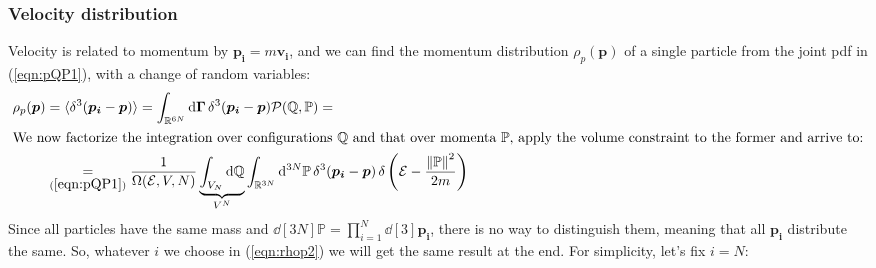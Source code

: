 \documentclass[../../main.tex]{subfiles}
\begin{document}
\subsubsection{Velocity distribution} 
Velocity is related to momentum by $\bm{p_i} = m \bm{v_i}$, and we can find the momentum distribution $\rho_p(\bm{p})$ of a single particle from the joint pdf in (\ref{eqn:pQP1}), with a change of random variables:
\begin{align}\nonumber
    \rho_p(\bm{p}) &= \langle \delta^3 (\bm{p_i} - \bm{p}) \rangle = \int_{\mathbb{R}^{6N}} \dd{\bm{\Gamma}} \delta^3 (\bm{p_i} - \bm{p}) \mathcal{P}(\mathbb{Q}, \mathbb{P}) =\\
    \shortintertext{We now factorize the integration over configurations $\mathbb{Q}$ and that over momenta $\mathbb{P}$, apply the volume constraint to the former and arrive to:}
    &\underset{(\ref{eqn:pQP1})}{=}  \frac{1}{\Omega(\mathcal{E}, V, N)} \underbrace{\int_{V_N} \dd{\mathbb{Q}}}_{V^N}  \int_{\mathbb{R}^{3N}} \dd[3N]{\mathbb{P}} \delta^3(\bm{p_i} - \bm{p})\, \delta\left(\mathcal{E}-\frac{\norm{\mathbb{P}}^2}{2m} \right) \label{eqn:rhop2}
\end{align}
Since all particles have the same mass and $\dd[3N]{\mathbb{P}} = \prod_{i=1}^N \dd[3]{\bm{p_i}}$, there is no way to distinguish them, meaning that all $\bm{p_i}$ distribute the same. So, whatever $i$ we choose in (\ref{eqn:rhop2}) we will get the same result at the end. For simplicity, let's fix $i = N$:
\end{document}
